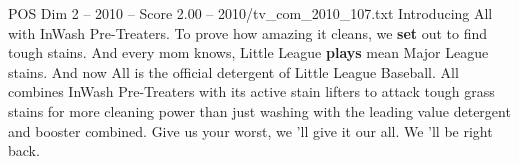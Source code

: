 \begin{textsample}{POS Dim 2 – 2010 – Score 2.00 – 2010/tv\_com\_2010\_107.txt}  \label{ex:f2_pos_043}
Introducing All with InWash Pre-Treaters.
To prove how amazing it cleans, we \textbf{set} out to find tough stains.
And every mom knows, Little League \textbf{plays} mean Major League stains.
And now All is the official detergent of Little League Baseball.
All combines InWash Pre-Treaters with its active stain lifters to attack tough grass stains for more cleaning power than just washing with the leading value detergent and booster combined.
Give us your worst, we 'll give it our all.
We 'll be right back.

\end{textsample}
